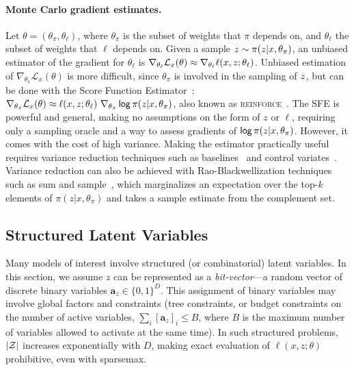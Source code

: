 \paragraph*{Monte Carlo gradient estimates.} Let $\theta=(\theta_\pi,
\theta_\ell)$, where $\theta_\pi$ is the subset of weights that $\pi$
depends on, and $\theta_\ell$ the subset of weights that $\ell$
depends on. Given a sample $z \sim \pi(z| x,\theta_\pi)$, an
unbiased estimator of the gradient for  \wrt
$\theta_\ell$ is $\nabla_{\theta_\ell} \mathcal L_x(\theta) \approx
\nabla_{\theta_\ell} \ell(x, z; \theta_\ell)$. Unbiased
estimation of $\nabla_{\theta_\pi} \mathcal L_x(\theta)$ is more
difficult, since $\theta_\pi$ is involved in the sampling of
$z$, but can be done with the Score Function
Estimator~\citep[SFE;][]{rubinstein1976monte,paisley2012variational}:
$\nabla_{\theta_\pi} \mathcal L_x(\theta) \approx \ell(x, z;
\theta_\ell) ~ \nabla_{\theta_\pi} \operatorname*{\mathsf{log}} \pi(z | x, \theta_\pi)$,
also known as \textsc{reinforce}~\citep{Williams1992}. The SFE is
powerful and general, making no assumptions on the form of $z$ or
$\ell$, requiring only a sampling oracle and a way to assess
gradients of $\operatorname*{\mathsf{log}} \pi(z | x, \theta_\pi)$. However, it comes
with the cost of high variance. Making the estimator practically
useful requires variance reduction techniques such as
baselines~\citep{Williams1992,MuProp} and control
variates~\citep{CV2013,REBAR,RELAX}. Variance reduction can also be
achieved with Rao-Blackwellization techniques such as sum and
sample~\citep{casella1996rao,BBVI14,RB19}, which marginalizes an
expectation over the top-$k$ elements of $\pi(z| x,\theta_\pi)$ and
takes a sample estimate from the complement set.

\subsection{Structured Latent Variables}\label{sec:struct_lvm_bg}

Many models of interest involve structured (or combinatorial) latent
variables. In this section, we assume $z$ can be represented as a
{\it bit-vector}---\ie a random vector of discrete binary variables
$\bm{a}_{z} \in \{0, 1\}^D$. This assignment of binary variables may
involve global factors and constraints (\eg tree constraints, or
budget constraints on the number of active variables, \ie $\sum_i
[\bm{a}_{z}]_i \le B$, where $B$ is the maximum number of variables
allowed to activate at the same time). In such structured problems,
$|\mathcal{Z}|$ increases exponentially with $D$, making exact evaluation of
$\ell(x, z; \theta)$ prohibitive, even with sparsemax.

